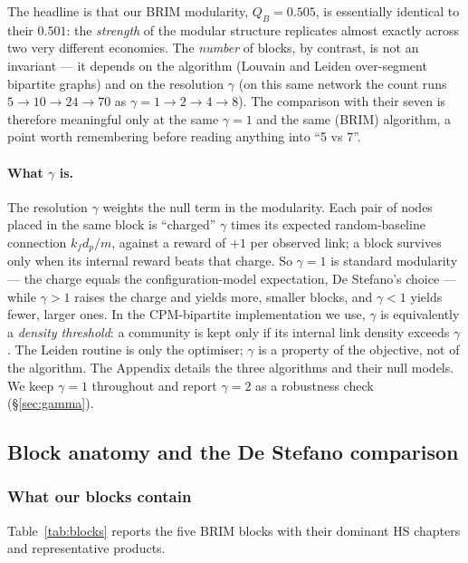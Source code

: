 \documentclass[11pt]{article}
\newcommand{\QB}{Q_B}
\begin{document}
The headline is that our BRIM modularity, $\QB=0.505$, is essentially identical to their $0.501$: the
\emph{strength} of the modular structure replicates almost exactly across two very different economies. The
\emph{number} of blocks, by contrast, is not an invariant --- it depends on the algorithm (Louvain and Leiden
over-segment bipartite graphs) and on the resolution $\gamma$ (on this same network the count runs
$5\to10\to24\to70$ as $\gamma=1\to2\to4\to8$). The comparison with their seven is therefore meaningful only at
the same $\gamma=1$ and the same (BRIM) algorithm, a point worth remembering before reading anything into ``5
vs 7''.

\paragraph{What $\gamma$ is.} The resolution $\gamma$ weights the null term in the modularity. Each pair of
nodes placed in the same block is ``charged'' $\gamma$ times its expected random-baseline connection
$k_f d_p/m$, against a reward of $+1$ per observed link; a block survives only when its internal reward beats
that charge. So $\gamma=1$ is standard modularity --- the charge equals the configuration-model expectation,
De Stefano's choice --- while $\gamma>1$ raises the charge and yields more, smaller blocks, and $\gamma<1$
yields fewer, larger ones. In the CPM-bipartite implementation we use, $\gamma$ is equivalently a
\emph{density threshold}: a community is kept only if its internal link density exceeds $\gamma$. The Leiden
routine is only the optimiser; $\gamma$ is a property of the objective, not of the algorithm. The Appendix
details the three algorithms and their null models. We keep $\gamma=1$ throughout and report $\gamma=2$ as a
robustness check (\S\ref{sec:gamma}).

\subsection{Block anatomy and the De Stefano comparison}

\subsubsection{What our blocks contain}
Table~\ref{tab:blocks} reports the five BRIM blocks with their dominant HS chapters and representative products.
\end{document}
